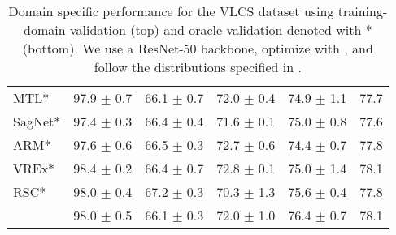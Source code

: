 \begin{table*}
\begin{center}
\begin{tabular}{lccccc}
MTL*                  & 97.9 $\pm$ 0.7       & 66.1 $\pm$ 0.7       & 72.0 $\pm$ 0.4       & 74.9 $\pm$ 1.1       & 77.7                 \\
SagNet*               & 97.4 $\pm$ 0.3       & 66.4 $\pm$ 0.4       & 71.6 $\pm$ 0.1       & 75.0 $\pm$ 0.8       & 77.6                 \\
ARM*                  & 97.6 $\pm$ 0.6       & 66.5 $\pm$ 0.3       & 72.7 $\pm$ 0.6       & 74.4 $\pm$ 0.7       & 77.8                 \\
VREx*                 & 98.4 $\pm$ 0.2       & 66.4 $\pm$ 0.7       & 72.8 $\pm$ 0.1       & 75.0 $\pm$ 1.4       & 78.1                 \\
RSC*                  & 98.0 $\pm$ 0.4       & 67.2 $\pm$ 0.3       & 70.3 $\pm$ 1.3       & 75.6 $\pm$ 0.4       & 77.8                 \\
\tdivcams 	   & 98.0 $\pm$ 0.5       & 66.1 $\pm$ 0.3        & 72.0 $\pm$ 1.0       & 76.4 $\pm$ 0.7        & 78.1                 \\
\bottomrule
\end{tabular}
\caption[Domain specific performance for the VLCS dataset]{Domain specific performance for the VLCS dataset using training-domain validation (top) and  oracle validation denoted with * (bottom). We use a ResNet-50 backbone, optimize with \adam, and follow the distributions specified in \domainbed.}
\end{center}
\end{table*}


